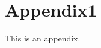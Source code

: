 \documentclass[./mainBiblatex]{subfiles}
\begin{document}
\section{Appendix1}
This is an appendix.

\end{document}
